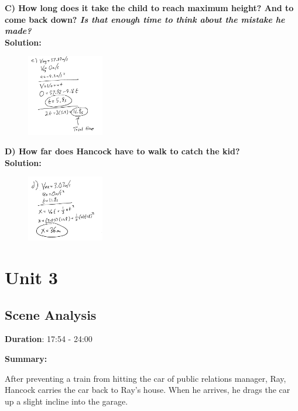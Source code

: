 \documentclass[a4paper,12pt]{article}
\begin{document}
\noindent\textbf{C) How long does it take the child to reach maximum height? And to come back down? \emph{Is that enough time to think about the mistake he made?}} \\

\noindent\textbf{Solution:}

\begin{figure}[H]
    \centering
    \includegraphics[width=0.3\textwidth]{U2_P1_C} %
\end{figure}

\noindent\textbf{D) How far does Hancock have to walk to catch the kid?} \\

\noindent\textbf{Solution:}

\begin{figure}[H]
    \centering
    \includegraphics[width=0.3\textwidth]{U2_P1_D} %
\end{figure}

\section{Unit 3}

\vspace{-0.5cm}
\singlespacing

\subsection{Scene Analysis}

\textbf{Duration}: 17:54 - 24:00

\vspace{0.3cm}
\noindent\textbf{Summary:} \par
After preventing a train from hitting the car of public relations manager, Ray, Hancock carries the car back to Ray's house. When he arrives, he drags the car up a slight incline into the garage. \\
\par
\end{document}
